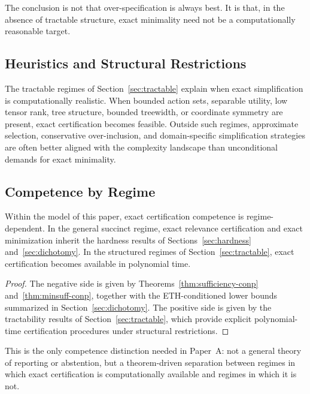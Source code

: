 \begin{remark}
The conclusion is not that over-specification is always best. It is that, in the absence of tractable structure, exact minimality need not be a computationally reasonable target.
\end{remark}

\subsection{Heuristics and Structural Restrictions}

The tractable regimes of Section~\ref{sec:tractable} explain when exact simplification is computationally realistic. When bounded action sets, separable utility, low tensor rank, tree structure, bounded treewidth, or coordinate symmetry are present, exact certification becomes feasible. Outside such regimes, approximate selection, conservative over-inclusion, and domain-specific simplification strategies are often better aligned with the complexity landscape than unconditional demands for exact minimality.

\subsection{Competence by Regime}

\begin{proposition}
\label{prop:competence-by-regime}
Within the model of this paper, exact certification competence is regime-dependent. In the general succinct regime, exact relevance certification and exact minimization inherit the hardness results of Sections~\ref{sec:hardness} and~\ref{sec:dichotomy}. In the structured regimes of Section~\ref{sec:tractable}, exact certification becomes available in polynomial time.
\end{proposition}

\begin{proof}
The negative side is given by Theorems~\ref{thm:sufficiency-conp} and~\ref{thm:minsuff-conp}, together with the ETH-conditioned lower bounds summarized in Section~\ref{sec:dichotomy}. The positive side is given by the tractability results of Section~\ref{sec:tractable}, which provide explicit polynomial-time certification procedures under structural restrictions.
\end{proof}

\begin{remark}
This is the only competence distinction needed in Paper~A: not a general theory of reporting or abstention, but a theorem-driven separation between regimes in which exact certification is computationally available and regimes in which it is not.
\end{remark}

